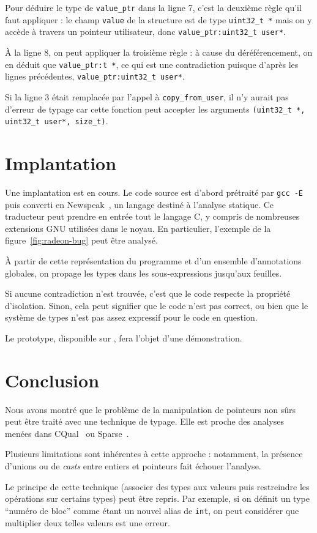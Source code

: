 Pour déduire le type de \texttt{value\_ptr} dans la ligne 7, c'est la
deuxième règle qu'il faut appliquer : le champ \texttt{value} de
la structure est de type \texttt{uint32\_t~*} mais on y accède à travers
un pointeur utilisateur, donc \texttt{value\_ptr:uint32\_t user*}.

À la ligne 8, on peut appliquer la troisième règle : à cause du déréférencement,
on en déduit que \texttt{value\_ptr:t *}, ce qui est une contradiction puisque
d'après les lignes précédentes, \texttt{value\_ptr:uint32\_t user*}.

Si la ligne 3 était remplacée par l'appel à \texttt{copy\_from\_user}, il n'y
aurait pas d'erreur de typage car cette fonction peut accepter les arguments
\texttt{(uint32\_t~*, uint32\_t user*, size\_t)}.

\section{Implantation}

Une implantation est en cours. Le code source est d'abord prétraité par
\texttt{gcc -E} puis converti en Newspeak~\cite{newspeak}, un langage destiné à
l'analyse statique. Ce traducteur peut prendre en entrée tout le langage C, y
compris de nombreuses extensions GNU utilisées dans le noyau. En particulier,
l'exemple de la figure~\ref{fig:radeon-bug} peut être analysé.

À partir de cette représentation du programme et d'un ensemble d'annotations
globales, on propage les types dans les sous-expressions jusqu'aux feuilles.

Si aucune contradiction n'est trouvée, c'est que le code respecte la propriété
d'isolation. Sinon, cela peut signifier que le code n'est pas correct, ou bien
que le système de types n'est pas assez expressif pour le code en question.

Le prototype, disponible sur , fera l'objet d'une démonstration.

\section{Conclusion}


Nous avons montré que le problème de la manipulation de pointeurs non sûrs peut
être traité avec une technique de typage. Elle est proche des analyses menées
dans CQual~\cite{pldi99} ou Sparse~.


Plusieurs limitations sont inhérentes à cette approche : notamment, la présence
d'unions ou de \emph{casts} entre entiers et pointeurs fait échouer l'analyse.


Le principe de cette technique (associer des types aux valeurs puis restreindre
les opérations sur certains types) peut être repris. Par exemple, si on définit
un type ``numéro de bloc'' comme étant un nouvel alias de \texttt{int}, on peut
considérer que multiplier deux telles valeurs est une erreur.

